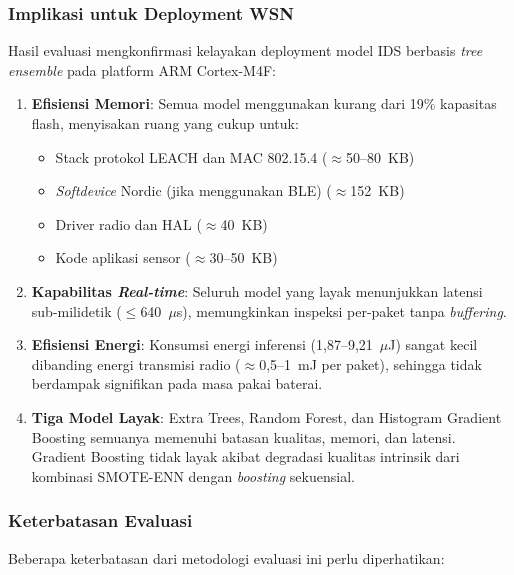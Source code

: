 \subsubsection{Implikasi untuk Deployment WSN}

Hasil evaluasi mengkonfirmasi kelayakan deployment model IDS berbasis \textit{tree ensemble} pada platform ARM Cortex-M4F:

\begin{enumerate}
    \item \textbf{Efisiensi Memori}: Semua model menggunakan kurang dari 19\% kapasitas flash, menyisakan ruang yang cukup untuk:
    \begin{itemize}
        \item Stack protokol LEACH dan MAC 802.15.4 ($\approx$50--80~KB)
        \item \textit{Softdevice} Nordic (jika menggunakan BLE) ($\approx$152~KB)
        \item Driver radio dan HAL ($\approx$40~KB)
        \item Kode aplikasi sensor ($\approx$30--50~KB)
    \end{itemize}

    \item \textbf{Kapabilitas \textit{Real-time}}: Seluruh model yang layak menunjukkan latensi sub-milidetik ($\leq$640~$\mu$s), memungkinkan inspeksi per-paket tanpa \textit{buffering}.

    \item \textbf{Efisiensi Energi}: Konsumsi energi inferensi (1,87--9,21~$\mu$J) sangat kecil dibanding energi transmisi radio ($\approx$0,5--1~mJ per paket), sehingga tidak berdampak signifikan pada masa pakai baterai.

    \item \textbf{Tiga Model Layak}: Extra Trees, Random Forest, dan Histogram Gradient Boosting semuanya memenuhi batasan kualitas, memori, dan latensi. Gradient Boosting tidak layak akibat degradasi kualitas intrinsik dari kombinasi SMOTE-ENN dengan \textit{boosting} sekuensial.
\end{enumerate}

\subsubsection{Keterbatasan Evaluasi}

Beberapa keterbatasan dari metodologi evaluasi ini perlu diperhatikan:

